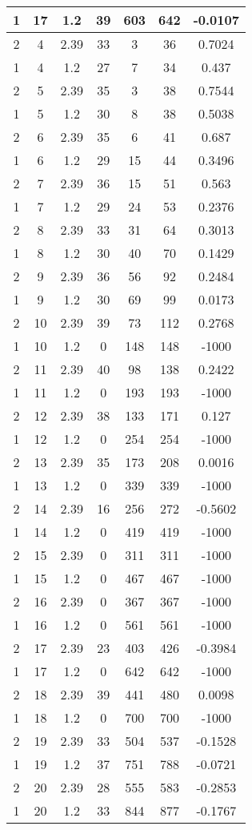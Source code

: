 \documentclass[letterpaper, 12pt]{article}
\begin{document}
\begin{longtable}{|c|c|c|c|c|c|c|}
\hline
1 & 17 & 1.2 & 39 & 603 & 642 & -0.0107 \\
\hline
2 & 4 & 2.39 & 33 & 3 & 36 & 0.7024 \\
\hline
1 & 4 & 1.2 & 27 & 7 & 34 & 0.437 \\
\hline
2 & 5 & 2.39 & 35 & 3 & 38 & 0.7544 \\
\hline
1 & 5 & 1.2 & 30 & 8 & 38 & 0.5038 \\
\hline
2 & 6 & 2.39 & 35 & 6 & 41 & 0.687 \\
\hline
1 & 6 & 1.2 & 29 & 15 & 44 & 0.3496 \\
\hline
2 & 7 & 2.39 & 36 & 15 & 51 & 0.563 \\
\hline
1 & 7 & 1.2 & 29 & 24 & 53 & 0.2376 \\
\hline
2 & 8 & 2.39 & 33 & 31 & 64 & 0.3013 \\
\hline
1 & 8 & 1.2 & 30 & 40 & 70 & 0.1429 \\
\hline
2 & 9 & 2.39 & 36 & 56 & 92 & 0.2484 \\
\hline
1 & 9 & 1.2 & 30 & 69 & 99 & 0.0173 \\
\hline
2 & 10 & 2.39 & 39 & 73 & 112 & 0.2768 \\
\hline
1 & 10 & 1.2 & 0 & 148 & 148 & -1000 \\
\hline
2 & 11 & 2.39 & 40 & 98 & 138 & 0.2422 \\
\hline
1 & 11 & 1.2 & 0 & 193 & 193 & -1000 \\
\hline
2 & 12 & 2.39 & 38 & 133 & 171 & 0.127 \\
\hline
1 & 12 & 1.2 & 0 & 254 & 254 & -1000 \\
\hline
2 & 13 & 2.39 & 35 & 173 & 208 & 0.0016 \\
\hline
1 & 13 & 1.2 & 0 & 339 & 339 & -1000 \\
\hline
2 & 14 & 2.39 & 16 & 256 & 272 & -0.5602 \\
\hline
1 & 14 & 1.2 & 0 & 419 & 419 & -1000 \\
\hline
2 & 15 & 2.39 & 0 & 311 & 311 & -1000 \\
\hline
1 & 15 & 1.2 & 0 & 467 & 467 & -1000 \\
\hline
2 & 16 & 2.39 & 0 & 367 & 367 & -1000 \\
\hline
1 & 16 & 1.2 & 0 & 561 & 561 & -1000 \\
\hline
2 & 17 & 2.39 & 23 & 403 & 426 & -0.3984 \\
\hline
1 & 17 & 1.2 & 0 & 642 & 642 & -1000 \\
\hline
2 & 18 & 2.39 & 39 & 441 & 480 & 0.0098 \\
\hline
1 & 18 & 1.2 & 0 & 700 & 700 & -1000 \\
\hline
2 & 19 & 2.39 & 33 & 504 & 537 & -0.1528 \\
\hline
1 & 19 & 1.2 & 37 & 751 & 788 & -0.0721 \\
\hline
2 & 20 & 2.39 & 28 & 555 & 583 & -0.2853 \\
\hline
1 & 20 & 1.2 & 33 & 844 & 877 & -0.1767 \\
\hline
\end{longtable}
\end{document}
